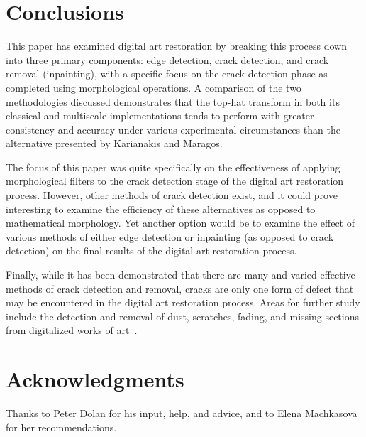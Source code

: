 \documentclass{sig-alternate}
\begin{document}
\section{Conclusions}\label{conclusion}
This paper has examined digital art restoration by breaking this process down into three primary components: edge detection, crack detection, and crack removal (inpainting), with a specific focus on the crack detection phase as completed using morphological operations. A comparison of the two methodologies discussed demonstrates that the top-hat transform in both its classical and multiscale implementations tends to perform with greater consistency and accuracy under various experimental circumstances than the alternative presented by Karianakis and Maragos.

The focus of this paper was quite specifically on the effectiveness of applying morphological filters to the crack detection stage of the digital art restoration process. However, other methods of crack detection exist, and it could prove interesting to examine the efficiency of these alternatives as opposed to mathematical morphology. Yet another option would be to examine the effect of various methods of either edge detection or inpainting (as opposed to crack detection) on the final results of the digital art restoration process.

Finally, while it has been demonstrated that there are many and varied effective methods of crack detection and removal, cracks are only one form of defect that may be encountered in the digital art restoration process. Areas for further study include the detection and removal of dust, scratches, fading, and missing sections from digitalized works of art~\cite{TopHat:2010}.

\section{Acknowledgments}
Thanks to Peter Dolan for his input, help, and advice, and to Elena Machkasova for her recommendations.


  
\end{document}
